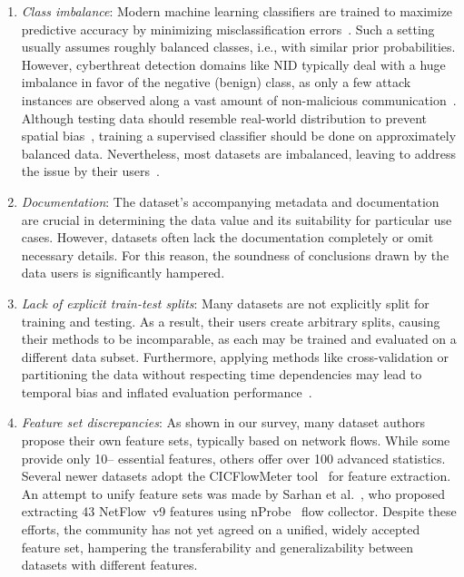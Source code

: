 \begin{enumerate}[wide, label={\arabic*)}, topsep=0pt, itemindent=\parindent, itemsep=0pt, parsep=0pt, partopsep=0pt]
\item \emph{Class imbalance}: Modern machine learning classifiers are trained to maximize predictive accuracy by minimizing misclassification errors~\cite{thabtah2020_data_imbalance}. Such a setting usually assumes roughly balanced classes, i.e., with similar prior probabilities. However, cyberthreat detection domains like NID typically deal with a huge imbalance in favor of the negative (benign) class, as only a few attack instances are observed along a vast amount of non-malicious communication~\cite{catillo2023_ml_public_ids_datasets}. Although testing data should resemble real-world distribution to prevent spatial bias~\cite{pendlebury2019_tesseract}, training a supervised classifier should be done on approximately balanced data. Nevertheless, most datasets are imbalanced, leaving to address the issue by their users~\cite{bagui2021_resampling_imbalanced_nids_data}.

\item \emph{Documentation}: The dataset's accompanying metadata and documentation are crucial in determining the data value and its suitability for particular use cases. However, datasets often lack the documentation completely or omit necessary details. For this reason, the soundness of conclusions drawn by the data users is significantly hampered.

\item \emph{Lack of explicit train-test splits}: Many datasets are not explicitly split for training and testing. As a result, their users create arbitrary splits, causing their methods to be incomparable, as each may be trained and evaluated on a different data subset. Furthermore, applying methods like cross-validation or partitioning the data without respecting time dependencies may lead to temporal bias and inflated evaluation performance~\cite{arp2022_dos_donts_ml_security, pendlebury2019_tesseract}. 

\item \emph{Feature set discrepancies}: As shown in our survey, many dataset authors propose their own feature sets, typically based on network flows. While some provide only 10\;-- essential features, others offer over 100 advanced statistics. Several newer datasets adopt the CICFlowMeter tool~\cite{lashkari2016_cicflowmeter} for feature extraction. An attempt to unify feature sets was made by Sarhan et al.~\cite{sarhan2022_nids_feature_set,sarhan2021_netflow_datasets_ml_nids}, who proposed extracting 43 NetFlow~v9 features using nProbe~\cite{ntop_nprobe} flow collector. Despite these efforts, the community has not yet agreed on a unified, widely accepted feature set, hampering the transferability and generalizability between datasets with different features.


\end{enumerate}
